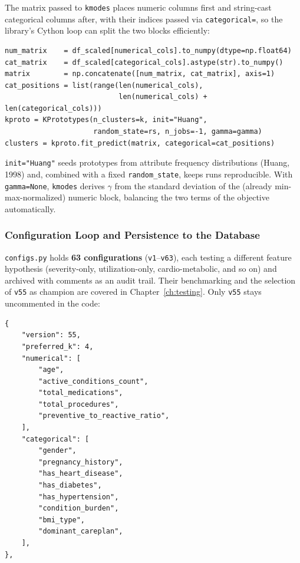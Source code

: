 The matrix passed to \texttt{kmodes} places numeric columns first and string-cast categorical columns after, with their indices passed via \texttt{categorical=}, so the library's Cython loop can split the two blocks efficiently:

\begin{lstlisting}[style=pythonstyle]
num_matrix    = df_scaled[numerical_cols].to_numpy(dtype=np.float64)
cat_matrix    = df_scaled[categorical_cols].astype(str).to_numpy()
matrix        = np.concatenate([num_matrix, cat_matrix], axis=1)
cat_positions = list(range(len(numerical_cols),
                           len(numerical_cols) + len(categorical_cols)))
kproto = KPrototypes(n_clusters=k, init="Huang",
                     random_state=rs, n_jobs=-1, gamma=gamma)
clusters = kproto.fit_predict(matrix, categorical=cat_positions)
\end{lstlisting}

\texttt{init="Huang"} seeds prototypes from attribute frequency distributions (Huang, 1998) and, combined with a fixed \texttt{random\_state}, keeps runs reproducible. With \texttt{gamma=None}, \texttt{kmodes} derives $\gamma$ from the standard deviation of the (already min-max-normalized) numeric block, balancing the two terms of the objective automatically.

\subsubsection*{Configuration Loop and Persistence to the Database}

\texttt{configs.py} holds \textbf{63 configurations} (\texttt{v1}--\texttt{v63}), each testing a different feature hypothesis (severity-only, utilization-only, cardio-metabolic, and so on) and archived with comments as an audit trail. Their benchmarking and the selection of \texttt{v55} as champion are covered in Chapter~\ref{ch:testing}. Only \texttt{v55} stays uncommented in the code:

\begin{lstlisting}[style=pythonstyle]
{
    "version": 55,
    "preferred_k": 4,
    "numerical": [
        "age",
        "active_conditions_count",
        "total_medications",
        "total_procedures",
        "preventive_to_reactive_ratio",
    ],
    "categorical": [
        "gender",
        "pregnancy_history",
        "has_heart_disease",
        "has_diabetes",
        "has_hypertension",
        "condition_burden",
        "bmi_type",
        "dominant_careplan",
    ],
},
\end{lstlisting}

